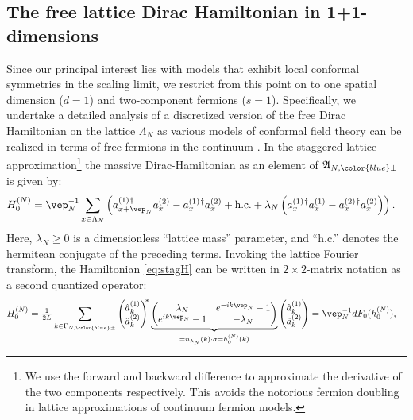 \documentclass[a4paper, 11pt]{article}
\newcommand{\fA}{\mathfrak{A}}\newcommand{\cA}{\mathcal{A}}\newcommand{\dA}{\mathds{A}}\newcommand{\sA}{\mathscr{A}}
\DeclareMathOperator{\1}{\mathds{1}}
\begin{document}
\subsection{The free lattice Dirac Hamiltonian in 1+1-dimensions}
\label{sec:latdirac}
Since our principal interest lies with models that exhibit local conformal symmetries in the scaling limit, we restrict from this point on to one spatial dimension ($d=1$) and two-component fermions ($s=1$). Specifically, we undertake a detailed analysis of a discretized version of the free Dirac Hamiltonian on the lattice $\Lambda_{N}$ as various models of conformal field theory can be realized in terms of free fermions in the continuum \cite{DiFrancescoCFTBook, EvansQuantumSymmetriesOn, XuSomeResultsOn, WassermannOperatorAlgebrasAnd}. In the staggered lattice approximation\footnote{We use the forward and backward difference to approximate the derivative of the two components respectively. This avoids the notorious fermion doubling in lattice approximations of continuum fermion models.} \cite{SusskindLatticeFermions} the massive Dirac-Hamiltonian as an element of $\fA_{N,{\color{blue}\pm}}$ is given by:
\begin{align}
\label{eq:stagH}
H^{(N)}_{0} & = \vep_{N}^{-1}\sum_{x\in\Lambda_{N}}\left(a^{(1)\!\!\ \dagger}_{x+\vep_{N}}a^{(2)}_{x} - a^{(1)\!\!\ \dagger}_{x}a^{(2)}_{x} + \textup{h.c.} + \lambda_{N}\left(a^{(1)\!\!\ \dagger}_{x}a^{(1)}_{x} - a^{(2)\!\!\ \dagger}_{x}a^{(2)}_{x}\right)\right).
\end{align}
Here, $\lambda_{N}\geq0$ is a dimensionless ``lattice mass'' parameter, and ``h.c.'' denotes the hermitean conjugate of the preceding terms. Invoking the lattice Fourier transform, the Hamiltonian \eqref{eq:stagH} can be written in $2\times 2$-matrix notation as a second quantized operator:
\begin{align}
\label{eq:FstagH}
H^{(N)}_{0} & = \tfrac{1}{2L}\sum_{k\in\Gamma_{N,{\color{blue}\pm}}}\begin{pmatrix} \hat{a}^{(1)}_{k} \\ \hat{a}^{(2)}_{k} \end{pmatrix}^{\!\!*} \underbrace{\begin{pmatrix} \lambda_{N} & e^{-ik\vep_{N}}-1 \\ e^{ik\vep_{N}}-1 & -\lambda_{N} \end{pmatrix}}_{= n_{\lambda_{N}}(k)\cdot\sigma = h^{(N)}_{0}(k)} \begin{pmatrix} \hat{a}^{(1)}_{k} \\ \hat{a}^{(2)}_{k} \end{pmatrix} = \vep_{N}^{-1}dF_{0}(h^{(N)}_{0}),
\end{align}
\end{document}
